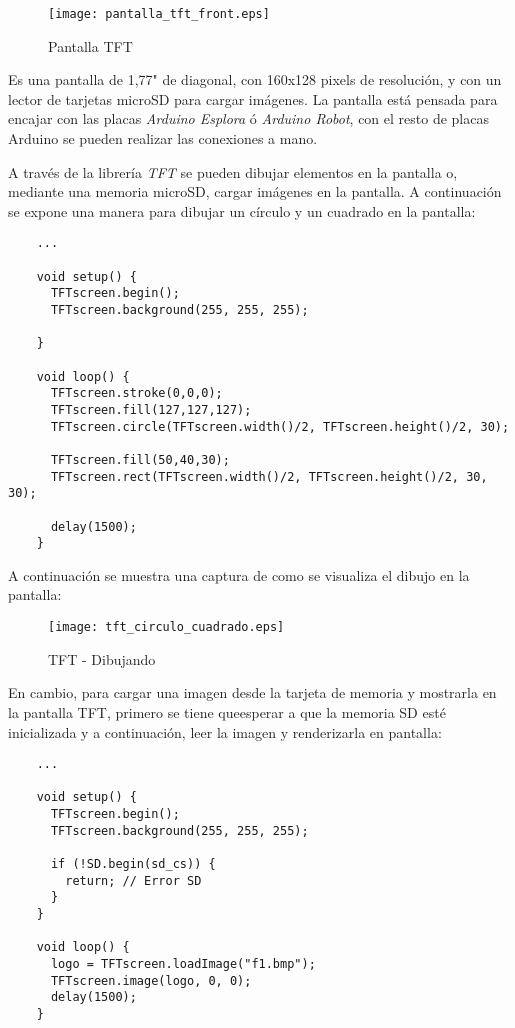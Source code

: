 \begin{figure}[h!]
    \centering
    \texttt{[image: pantalla\_tft\_front.eps]}
    \caption{Pantalla TFT}\label{fig:arduino-tft-front}
\end{figure}



Es una pantalla de 1,77" de diagonal, con 160x128 pixels de resolución, y con un lector de tarjetas microSD para cargar imágenes. La pantalla está pensada para encajar con las placas \emph{Arduino Esplora} ó \emph{Arduino Robot}, con el resto de placas Arduino se pueden realizar las conexiones a mano.

A través de la librería \emph{TFT} se pueden dibujar elementos en la pantalla o, mediante una memoria microSD, cargar imágenes en la pantalla. A continuación se expone una manera para dibujar un círculo y un cuadrado en la pantalla:

\begin{lstlisting}
    ...

    void setup() {
      TFTscreen.begin();
      TFTscreen.background(255, 255, 255);

    }

    void loop() {
      TFTscreen.stroke(0,0,0);
      TFTscreen.fill(127,127,127);
      TFTscreen.circle(TFTscreen.width()/2, TFTscreen.height()/2, 30);

      TFTscreen.fill(50,40,30);
      TFTscreen.rect(TFTscreen.width()/2, TFTscreen.height()/2, 30, 30);

      delay(1500);
    }
\end{lstlisting}

A continuación se muestra una captura de como se visualiza el dibujo en la pantalla:

\begin{figure}[h!]
    \centering
    \texttt{[image: tft\_circulo\_cuadrado.eps]}
    \caption{TFT - Dibujando}\label{fig:tft_circulo_cuadrado}
\end{figure}

En cambio, para cargar una imagen desde la tarjeta de memoria y mostrarla en la pantalla TFT, primero se tiene queesperar a que la memoria SD esté inicializada y a continuación, leer la imagen y renderizarla en pantalla:

\begin{lstlisting}
    ...

    void setup() {
      TFTscreen.begin();
      TFTscreen.background(255, 255, 255);

      if (!SD.begin(sd_cs)) {
        return; // Error SD
      }
    }

    void loop() {
      logo = TFTscreen.loadImage("f1.bmp");
      TFTscreen.image(logo, 0, 0);
      delay(1500);
    }
\end{lstlisting}

